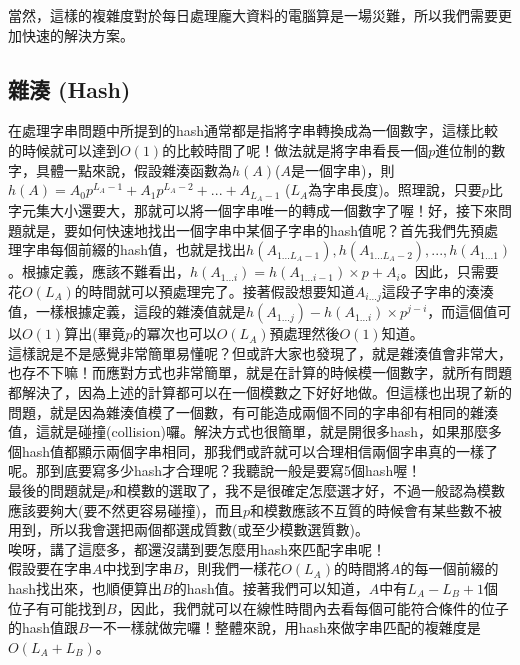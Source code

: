 當然，這樣的複雜度對於每日處理龐大資料的電腦算是一場災難，所以我們需要更加快速的解決方案。

\subsection{雜湊 (Hash)}
在處理字串問題中所提到的hash通常都是指將字串轉換成為一個數字，這樣比較的時候就可以達到$O(1)$的比較時間了呢！做法就是將字串看長一個$p$進位制的數字，具體一點來說，假設雜湊函數為$h(A)$($A$是一個字串)，則
\begin{math}
h(A) = A_0p^{L_A-1} + A_1p^{L_A-2} + ... + A_{L_A-1}
\end{math}
($L_A$為字串長度)。照理說，只要$p$比字元集大小還要大，那就可以將一個字串唯一的轉成一個數字了喔！好，接下來問題就是，要如何快速地找出一個字串中某個子字串的hash值呢？首先我們先預處理字串每個前綴的hash值，也就是找出$h(A_{1...L_A-1}), h(A_{1...L_A-2}),...,h(A_{1...1})$。根據定義，應該不難看出，$h(A_{1...i}) = h(A_{1...i-1})\times p + A_i$。因此，只需要花$O(L_A)$的時間就可以預處理完了。接著假設想要知道$A_{i...j}$這段子字串的湊湊值，一樣根據定義，這段的雜湊值就是$h(A_{1...j}) - h(A_{1...i})\times p^{j-i}$，而這個值可以$O(1)$算出(畢竟$p$的冪次也可以$O(L_A)$預處理然後$O(1)$知道。\\

這樣說是不是感覺非常簡單易懂呢？但或許大家也發現了，就是雜湊值會非常大，也存不下嘛！而應對方式也非常簡單，就是在計算的時候模一個數字，就所有問題都解決了，因為上述的計算都可以在一個模數之下好好地做。但這樣也出現了新的問題，就是因為雜湊值模了一個數，有可能造成兩個不同的字串卻有相同的雜湊值，這就是碰撞(collision)囉。解決方式也很簡單，就是開很多hash，如果那麼多個hash值都顯示兩個字串相同，那我們或許就可以合理相信兩個字串真的一樣了呢。那到底要寫多少hash才合理呢？我聽說一般是要寫5個hash喔！\\

最後的問題就是$p$和模數的選取了，我不是很確定怎麼選才好，不過一般認為模數應該要夠大(要不然更容易碰撞)，而且$p$和模數應該不互質的時候會有某些數不被用到，所以我會選把兩個都選成質數(或至少模數選質數)。\\

唉呀，講了這麼多，都還沒講到要怎麼用hash來匹配字串呢！\\

假設要在字串$A$中找到字串$B$，則我們一樣花$O(L_A)$的時間將$A$的每一個前綴的hash找出來，也順便算出$B$的hash值。接著我們可以知道，$A$中有$L_A - L_B + 1$個位子有可能找到$B$，因此，我們就可以在線性時間內去看每個可能符合條件的位子的hash值跟$B$一不一樣就做完囉！整體來說，用hash來做字串匹配的複雜度是$O(L_A + L_B)$。\\


